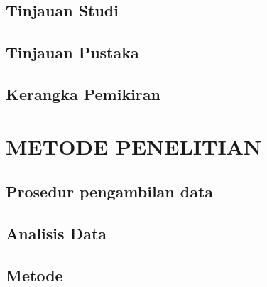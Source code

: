 \documentclass[a4paper,12pt]{report}
\begin{document}
\section{Tinjauan Studi}
\section{Tinjauan Pustaka}
\section{Kerangka Pemikiran}

\chapter{METODE PENELITIAN}
\section{Prosedur pengambilan data}
\section{Analisis Data}
\section{Metode}

\printbibliography
\end{document}
